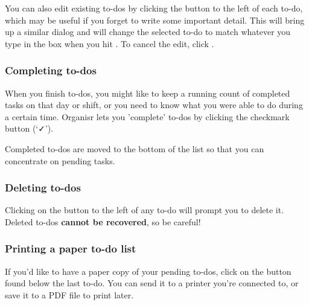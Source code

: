 You can also edit existing to-dos by clicking the  button to the left
of each to-do, which may be useful if you forget to write some important detail.
This will bring up a similar dialog and will change the selected to-do to match
whatever you type in the box when you hit . To cancel the edit,
click .


\subsubsection{Completing to-dos}


When you finish to-dos, you might like to keep a running count of completed
tasks on that day or shift, or you need to know what you were able to do during
a certain time. Organisr lets you 'complete' to-dos by clicking the
checkmark button (`✓').

Completed to-dos are moved to the bottom of the list so that you can concentrate
on pending tasks.


\subsubsection{Deleting to-dos}


Clicking on the  button to the left of any to-do will prompt you to
delete it. Deleted to-dos \textbf{cannot be recovered}, so be careful!



\subsubsection{Printing a paper to-do list}


If you'd like to have a paper copy of your pending to-dos, click on the
 button found below the last to-do. You can send it to a printer
you're connected to, or save it to a PDF file to print later.



